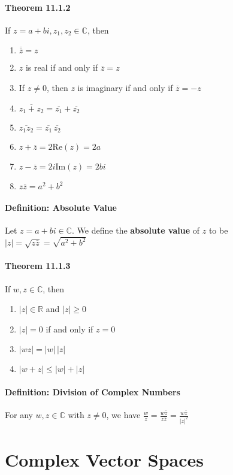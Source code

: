 \documentclass[10pt,letter]{article}
\begin{document}
\paragraph{Theorem 11.1.2}
If $z=a+bi,z_1,z_2\in\mathbb{C}$, then \begin{enumerate}
    \item $\overline{\overline{z}}=z$ 
    \item $z$ is real if and only if $\overline{z}=z$ 
    \item If $z\neq0$, then $z$ is imaginary if and only if $\overline{z}=-z$ 
    \item $\overline{z_1+z_2}=\overline{z_1}+\overline{z_2}$ 
    \item $\overline{z_1z_2}=\overline{z_1}\,\overline{z_2}$ 
    \item $z+\overline{z}=2\text{Re}(z)=2a$ 
    \item $z-\overline{z}=2i\text{Im}(z)=2bi$ 
    \item $z\overline{z}=a^2+b^2$
\end{enumerate}
\paragraph{Definition: Absolute Value}
Let $z=a+bi\in\mathbb{C}$. We define the \textbf{absolute value} of $z$ to be $|z|=\sqrt{z\overline{z}}=\sqrt{a^2+b^2}$ 
\paragraph{Theorem 11.1.3}
If $w,z\in\mathbb{C}$, then \begin{enumerate}
    \item $|z|\in\mathbb{R}$ and $|z|\geq 0$ 
    \item $|z|=0$ if and only if $z=0$ 
    \item $|wz|=|w|\,|z|$ 
    \item $|w+z|\leq|w|+|z|$
\end{enumerate}
\paragraph{Definition: Division of Complex Numbers}
For any $w,z\in\mathbb{C}$ with $z\neq0$, we have $\frac{w}{z}=\frac{w\overline{z}}{z\overline{z}}=\frac{w\overline{z}}{|z|^2}$

\section*{Complex Vector Spaces}
\end{document}
